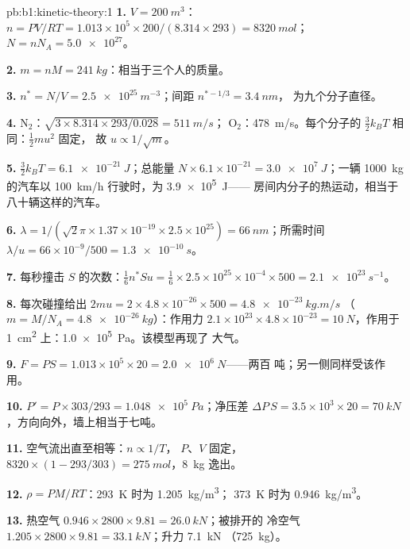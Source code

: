 \begin{solution}{pb:b1:kinetic-theory:1}
\textbf{1.} $V = \qty{200}{m^3}$：$n = PV/RT = 1.013\times10^5 \times 200/(8.314
\times 293) = \qty{8320}{mol}$；$N = nN_A = \num{5.0e27}$。

\textbf{2.} $m = nM = \qty{241}{kg}$：相当于三个人的质量。

\textbf{3.} $n^* = N/V = \qty{2.5e25}{m^{-3}}$；间距 $n^{*-1/3} = \qty{3.4}{nm}$，
为九个分子直径。

\textbf{4.} N$_2$：$\sqrt{3 \times 8.314 \times 293/0.028} = \qty{511}{m/s}$；
O$_2$：\qty{478}{m/s}。每个分子的 $\tfrac32 k_BT$ 相同：$\tfrac12 mu^2$ 固定，
故 $u \propto 1/\sqrt m$。

\textbf{5.} $\tfrac32 k_BT = \qty{6.1e-21}{J}$；总能量 $N \times 6.1\times10^{-21}
= \qty{3.0e7}{J}$；一辆 \qty{1000}{kg} 的汽车以 \qty{100}{km/h} 行驶时，为 \qty{3.9e5}{J}——
房间内分子的热运动，相当于八十辆这样的汽车。

\textbf{6.} $\lambda = 1/(\sqrt2\pi \times 1.37\times10^{-19} \times 2.5\times10^{25})
= \qty{66}{nm}$；所需时间 $\lambda/u = 66\times10^{-9}/500 = \qty{1.3e-10}{s}$。

\textbf{7.} 每秒撞击 $S$ 的次数：$\tfrac16 n^*Su = \tfrac16 \times 2.5\times
10^{25} \times 10^{-4} \times 500 = \qty{2.1e23}{s^{-1}}$。

\textbf{8.} 每次碰撞给出 $2mu = 2 \times 4.8\times10^{-26} \times 500 = \qty{4.8e-23}{kg.m/s}$
（$m = M/N_A = \qty{4.8e-26}{kg}$）：作用力 $2.1\times10^{23} \times 4.8\times10^{-23}
= \qty{10}{N}$，作用于 \qty{1}{cm^2} 上：\qty{1.0e5}{Pa}。该模型再现了
大气。

\textbf{9.} $F = PS = 1.013\times10^5 \times 20 = \qty{2.0e6}{N}$——两百
吨；另一侧同样受该作用。

\textbf{10.} $P' = P \times 303/293 = \qty{1.048e5}{Pa}$；净压差 $\Delta P\,S = 3.5
\times10^3 \times 20 = \qty{70}{kN}$，方向向外，墙上相当于七吨。

\textbf{11.} 空气流出直至相等：$n \propto 1/T$，
$P$、$V$ 固定，$8320 \times (1 - 293/303) = \qty{275}{mol}$，\qty{8}{kg}
逸出。

\textbf{12.} $\rho = PM/RT$：\qty{293}{K} 时为 \qty{1.205}{kg/m^3}；
\qty{373}{K} 时为 \qty{0.946}{kg/m^3}。

\textbf{13.} 热空气 $0.946 \times 2800 \times 9.81 = \qty{26.0}{kN}$；被排开的
冷空气 $1.205 \times 2800 \times 9.81 = \qty{33.1}{kN}$；升力 \qty{7.1}{kN}
（\qty{725}{kg}）。


\end{solution}
